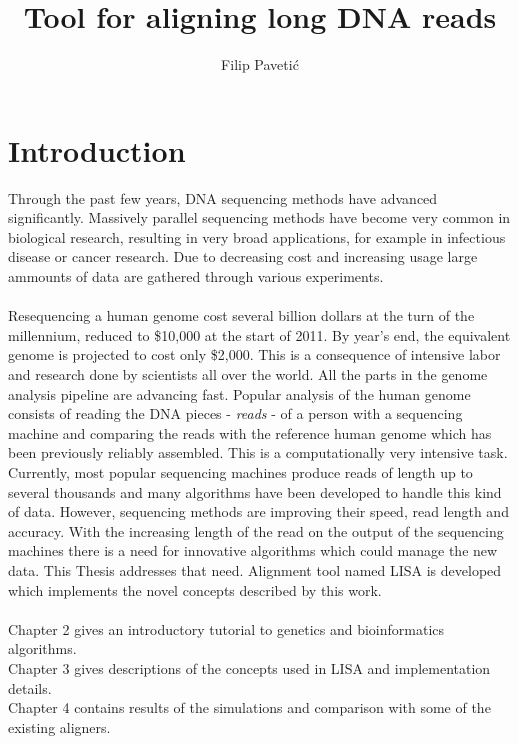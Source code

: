 \documentclass[times, utf8, diplomski]{fer}
\begin{document}

\title{Tool for aligning long DNA reads}

\author{Filip Paveti\'{c}}

\maketitle

\izvornik


\tableofcontents

\chapter{Introduction}

Through the past few years, DNA sequencing methods have advanced significantly. Massively parallel sequencing methods have become very common in biological research, resulting in very broad applications, for example in infectious disease or cancer research. Due to decreasing cost and increasing usage large ammounts of data are gathered through various experiments.\\
\\
Resequencing a human genome cost several billion dollars at the turn of the millennium, reduced to \$10,000 at the start of 2011. By year's end, the equivalent genome is projected to cost only \$2,000\cite{SNAP}. This is a consequence of intensive labor and research done by scientists all over the world. All the parts in the genome analysis pipeline are advancing fast. Popular analysis of the human genome consists of reading the DNA pieces - \emph{reads} - of a person with a sequencing machine and comparing the reads with the reference human genome which has been previously reliably assembled. This is a computationally very intensive task. Currently, most popular sequencing machines produce reads of length up to several thousands and many algorithms have been developed to handle this kind of data. However, sequencing methods are improving their speed, read length and accuracy. With the increasing length of the read on the output of the sequencing machines there is a need for innovative algorithms which could manage the new data. This Thesis addresses that need. Alignment tool named LISA is developed which implements the novel concepts described by this work.\\
\\
Chapter 2 gives an introductory tutorial to genetics and bioinformatics algorithms.\\
Chapter 3 gives descriptions of the concepts used in LISA and implementation details.\\
Chapter 4 contains results of the simulations and comparison with some of the existing aligners.
\end{document}
